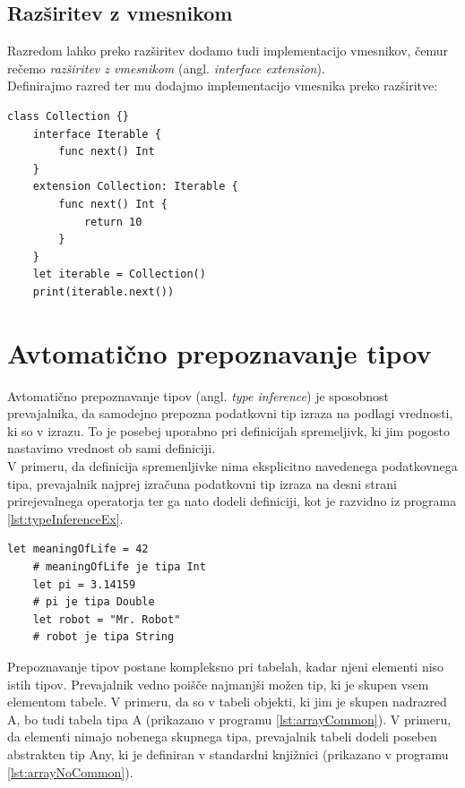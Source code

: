\documentclass[a4paper, 12p]{book}
\begin{document}
\subsection{Razširitev z vmesnikom}

Razredom lahko preko razširitev dodamo tudi implementacijo vmesnikov, čemur rečemo \textit{razširitev z vmesnikom} (angl. \textit{interface extension}).
\\\indent Definirajmo razred ter mu dodajmo implementacijo vmesnika preko razširitve:

\begin{lstlisting}[caption={}, captionpos=b]
	class Collection {}
	interface Iterable {
	    func next() Int
	}
	extension Collection: Iterable {
	    func next() Int {
	        return 10
	    }
	}
	let iterable = Collection()
	print(iterable.next())
\end{lstlisting}

\section{Avtomatično prepoznavanje tipov}

Avtomatično prepoznavanje tipov (angl. \textit{type inference}) je sposobnost prevajalnika, da samodejno prepozna podatkovni tip izraza na podlagi vrednosti, ki so v izrazu. To je posebej uporabno pri definicijah spremeljivk, ki jim pogosto nastavimo vrednost ob sami definiciji. \\
\indent V primeru, da definicija spremenljivke nima eksplicitno navedenega podatkovnega tipa, prevajalnik najprej izračuna podatkovni tip izraza na desni strani prirejevalnega operatorja ter ga nato dodeli definiciji, kot je razvidno iz programa \ref{lst:typeInferenceEx}.

\begin{lstlisting}[caption={Avtomatično prepoznavanje podatkovnih tipov.}, captionpos=b, label={lst:typeInferenceEx}]
	let meaningOfLife = 42
	# meaningOfLife je tipa Int
	let pi = 3.14159
	# pi je tipa Double
	let robot = "Mr. Robot"
	# robot je tipa String
\end{lstlisting}

Prepoznavanje tipov postane kompleksno pri tabelah, kadar njeni elementi niso istih tipov. Prevajalnik vedno poišče najmanjši možen tip, ki je skupen vsem elementom tabele. V primeru, da so v tabeli objekti, ki jim je skupen nadrazred {\ttfamily A}, bo tudi tabela tipa {\ttfamily A} (prikazano v programu \ref{lst:arrayCommon}). V primeru, da elementi nimajo nobenega skupnega tipa, prevajalnik tabeli dodeli poseben abstrakten tip {\ttfamily Any}, ki je definiran v standardni knjižnici (prikazano v programu \ref{lst:arrayNoCommon}).
\end{document}
